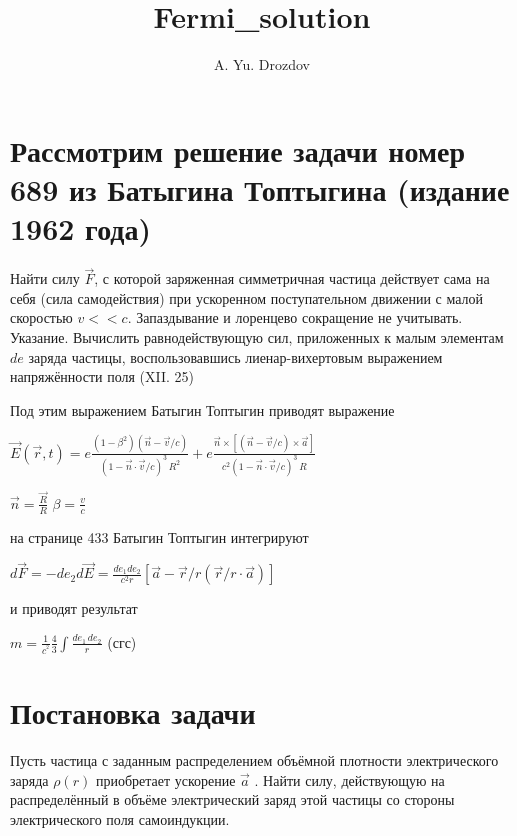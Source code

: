 \documentclass[11pt]{article}
\author{A. Yu. Drozdov}
\title{Fermi\_solution}
\begin{document}
    \maketitle

    \section{Рассмотрим решение задачи номер 689 из Батыгина Топтыгина
(издание 1962
года)}\label{ux440ux430ux441ux441ux43cux43eux442ux440ux438ux43c-ux440ux435ux448ux435ux43dux438ux435-ux437ux430ux434ux430ux447ux438-ux43dux43eux43cux435ux440-689-ux438ux437-ux431ux430ux442ux44bux433ux438ux43dux430-ux442ux43eux43fux442ux44bux433ux438ux43dux430-ux438ux437ux434ux430ux43dux438ux435-1962-ux433ux43eux434ux430}

Найти силу \(\vec{F}\), с которой заряженная симметричная частица
действует сама на себя (сила самодействия) при ускоренном поступательном
движении с малой скоростью \(v << c\). Запаздывание и лоренцево
сокращение не учитывать. Указание. Вычислить равнодействующую сил,
приложенных к малым элементам \(de\) заряда частицы, воспользовавшись
лиенар-вихертовым выражением напряжённости поля (XII. 25)

Под этим выражением Батыгин Топтыгин приводят выражение

\(\vec{E}\left(\vec{r},t\right) = e \frac{\left(1-\beta^2\right) \left(\vec{n}-\vec{v}/c \right)}{\left(1-\vec{n}\cdot\vec{v}/c\right)^3\,R^2} + e \frac{ \vec{n} \times \left[ \left( \vec{n}-\vec{v}/c\right) \times \vec{a}\right]}{c^2 \left(1-\vec{n} \cdot \vec{v}/c \right)^3 \,R }\)

\(\vec{n}=\frac{\vec{R}}{R}\) \(\beta=\frac{v}{c}\)

на странице 433 Батыгин Топтыгин интегрируют

\(d\vec{F} = - d e_2 d\vec{E} = \frac{de_1 de_2}{c^2 r} \left[ \vec{a} - \vec{r}/r\left( \vec{r}/r \cdot \vec{a}\right) \right]\)

и приводят результат

\(m =\frac{1}{{{c}^{^{2}}}}\frac{4}{3}\int\frac{de_1\,de_2}{r}\) (сгс)

    \section{Постановка
задачи}\label{ux43fux43eux441ux442ux430ux43dux43eux432ux43aux430-ux437ux430ux434ux430ux447ux438}

Пусть частица с заданным распределением объёмной плотности
электрического заряда \(\rho \left( r \right)\) приобретает ускорение
\(\overrightarrow{a}\) . Найти силу, действующую на распределённый в
объёме электрический заряд этой частицы со стороны электрического поля
самоиндукции.
\end{document}
